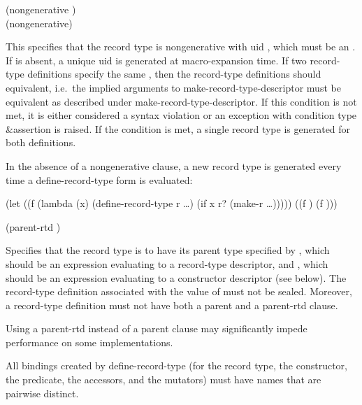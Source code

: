 \begin{entry}
{\cf (nongenerative )}\\
{\cf (nongenerative)}
   
This specifies that the record type is nongenerative with uid
, which must be an .
If  is absent, a unique uid is generated at macro-expansion time.
If two record-type definitions specify the same , then
the record-type definitions should equivalent, i.e.\
the implied arguments to {\cf make-record-type-descriptor}
must be equivalent as described under {\cf make-record-type-descriptor}.
If this condition is not met, it is either considered a syntax violation or
an exception with condition type {\cf\&assertion} is raised.
If the condition is met, a single record type is generated for both
definitions.

In the absence of a {\cf nongenerative} clause, a new record type is
generated every time a {\cf define-record-type} form is evaluated:

\begin{scheme}
(let ((f (lambda (x)
           (define-record-type r \ldots)
           (if x r? (make-r \ldots)))))
  ((f \schtrue) (f \schfalse))) \ev \schfalse{}
\end{scheme}

{\cf (parent-rtd  )}

Specifies that the record type is to have its parent type specified by
\hyper{parent rtd}, which should be an expression evaluating to a
record-type descriptor, and \hyper{parent cd}, which should be an
expression evaluating to a constructor descriptor (see below).  The
record-type definition associated with the value of 
must not be sealed.  Moreover, a record-type definition must not have
both a {\cf parent} and a {\cf parent-rtd} clause.

\begin{note}
  Using a {\cf parent-rtd} instead of a {\cf parent} clause may
  significantly impede performance on some implementations.
\end{note}

All bindings created by {\cf define-record-type} (for the record type,
the constructor, the predicate, the accessors, and the
mutators) must have names that are pairwise distinct.


\end{entry}
